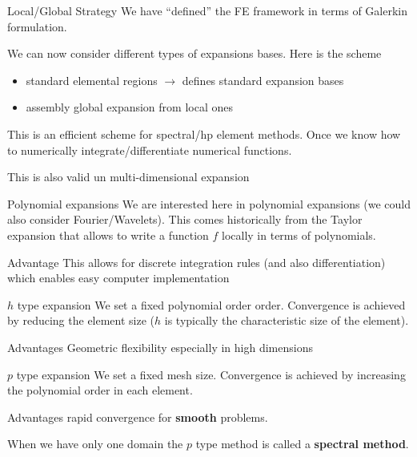 \begin{frame}{Local/Global Strategy}
  We have ``defined'' the FE framework in terms of Galerkin formulation.
  
  We can now consider different types of expansions bases. Here is the scheme
  \begin{itemize}
  \item standard elemental regions $\rightarrow$ defines standard expansion bases
  \item assembly global expansion from local ones
  \end{itemize}
  
  This is an efficient scheme for spectral/hp element methods. Once we
  know how to numerically integrate/differentiate numerical
  functions.

  \begin{alertblock}{}
    This is also valid un multi-dimensional expansion
  \end{alertblock}
\end{frame}

\begin{frame}{Polynomial expansions}
  We are interested here in polynomial expansions (we could also
  consider Fourier/Wavelets).  This comes historically from the Taylor
  expansion that allows to write a function $f$ locally in terms of
  polynomials.
  
  \begin{block}{Advantage}
    This allows for discrete integration rules (and also
    differentiation) which enables easy computer implementation
  \end{block}
\end{frame}

\begin{frame}{$h$ type expansion}
  We set a fixed polynomial order order. Convergence is achieved by
  reducing the element size ($h$ is typically the characteristic size
  of the element).

  \begin{block}{Advantages}
    Geometric flexibility especially in high dimensions
  \end{block}
\end{frame}

\begin{frame}{$p$ type expansion}
  We set a fixed mesh size. Convergence is achieved by
  increasing the polynomial order in each element.

  \begin{block}{Advantages}
    rapid convergence for \textbf{smooth} problems.
  \end{block}
  When we have only one domain the $p$ type method is called a \textbf{spectral method}.
\end{frame}

